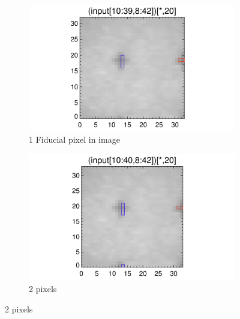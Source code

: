 \documentclass[10pt]{article}
\begin{document}
\begin{figure}[!h]
    \centering 
    \begin{subfigure}[b]{.45\linewidth}
        \centering
        \includegraphics[width=1.3\textwidth]{plots_tables_images/moarfidcheck_withbothtruncate1.png}
        \caption{1 Fiducial pixel in image}
    \end{subfigure}
    \begin{subfigure}[b]{.45\linewidth}
        \centering
        \includegraphics[width=1.3\textwidth]{plots_tables_images/moarfidcheck_withbothtruncate2.png}
        \caption{2 pixels}
    \end{subfigure}
   

\end{figure}
\end{document}
